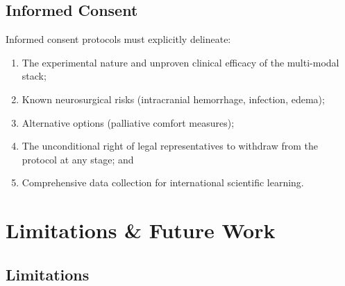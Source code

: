 \documentclass[12pt,a4paper]{article}
\begin{document}
\subsection{Informed Consent}

Informed consent protocols must explicitly delineate:
\begin{enumerate}
    \item The experimental nature and unproven clinical efficacy of the multi-modal stack;
    \item Known neurosurgical risks (intracranial hemorrhage, infection, edema);
    \item Alternative options (palliative comfort measures);
    \item The unconditional right of legal representatives to withdraw from the protocol at any stage; and
    \item Comprehensive data collection for international scientific learning.
\end{enumerate}

\section{Limitations \& Future Work}

\subsection{Limitations}
\end{document}
